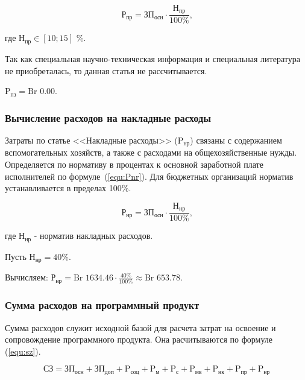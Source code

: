 \begin{equation}
    \label{equ:Pnk}
    \text{Р}_\text{пр} = \text{ЗП}_\text{осн} \cdot \frac{ \text{Н}_\text{пр} }{ 100\% } \text{,}
\end{equation}

где $\text{Н}_\text{пр} \in [10; 15]$ \%.

Так как специальная научно-техническая информация и специальная литература не приобреталась, то данная статья не рассчитывается.

$\text{P}_\text{пз} = \text{Br }0.00$.

\subsubsection*{Вычисление расходов на накладные расходы}

Затраты по статье <<Накладные расходы>> ($\text{P}_\text{нр}$)
связаны с содержанием вспомогательных хозяйств,
а также с расходами на общехозяйственные нужды.
Определяется по нормативу в процентах к основной заработной плате исполнителей по формуле~(\ref{equ:Pnr}).
Для бюджетных организаций норматив устанавливается в пределах 100\%.

\begin{equation}
    \label{equ:Pnr}
    \text{Р}_\text{нр} = \text{ЗП}_\text{осн} \cdot  \frac{ \text{Н}_\text{нр} }{ 100\% } \text{,}
\end{equation}

где $\text{Н}_\text{нр}$ - норматив накладных расходов.

Пусть $\text{Н}_\text{нр} = 40\%$.

Вычисляем: $\text{Р}_\text{нр} = \text{Br } 1634.46 \cdot \frac{ 40\% }{ 100\% } \approx \text{Br }653.78$.

\subsubsection*{Сумма расходов на программный продукт}

Сумма расходов служит исходной базой для расчета затрат на освоение и сопровождение программного продукта.
Она расчитываются по формуле (\ref{equ:sz}).

\begin{equation}
    \label{equ:sz}
    \text{СЗ} =
    \text{ЗП}_\text{осн}
    + \text{ЗП}_\text{доп}
    + \text{P}_\text{соц}
    + \text{P}_\text{м}
    + \text{P}_\text{с}
    + \text{P}_\text{мв}
    + \text{P}_\text{нк}
    + \text{P}_\text{пр}
    + \text{P}_\text{нр}
\end{equation}

